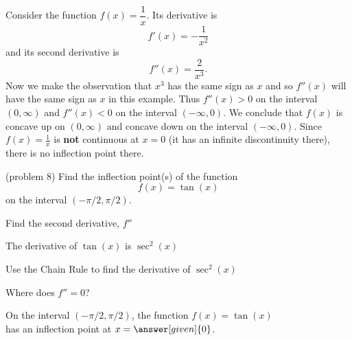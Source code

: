 \documentclass{ximera}
\begin{document}
\begin{example}[example 8]
Consider the function $f(x) = \dfrac{1}{x}.$ Its derivative is 
\[
f'(x) = -\frac{1}{x^2}
\]
and its second derivative is
\[
f''(x) = \frac{2}{x^3}.
\]
Now we make the observation that $x^3$ has the same sign as $x$ and so $f''(x)$ will have the same sign as $x$
in this example. Thus $f''(x) > 0$ on the interval $(0, \infty)$ and $f''(x) < 0$ on the interval $(-\infty,0).$
We conclude that $f(x)$ is concave up on $(0, \infty)$ and concave down on the interval $(-\infty, 0).$ 
Since $f(x) = \frac{1}{x}$ is \textbf{not} continuous at $x=0$ (it has an infinite discontinuity there), 
there is no inflection point there.  

\end{example}


\begin{problem}(problem 8)
  Find the inflection point(s) of the function
  \[
     f(x) = \tan(x)
  \]
	on the interval $(-\pi/2, \pi/2)$.\\
  
    \begin{hint}
      Find the second derivative, $f''$
    \end{hint}
    \begin{hint}
      The derivative of $\tan(x)$ is $\sec^2(x)$
    \end{hint}
		\begin{hint}
      Use the Chain Rule to find the derivative of $\sec^2(x)$
    \end{hint}
		\begin{hint}
      Where does $f'' = 0$?
    \end{hint}
	On the interval $(-\pi/2, \pi/2)$, the function $f(x) = \tan(x)$ \\
	has an inflection point at $x =\answer[given]{0}$.
 
\end{problem}
\end{document}
